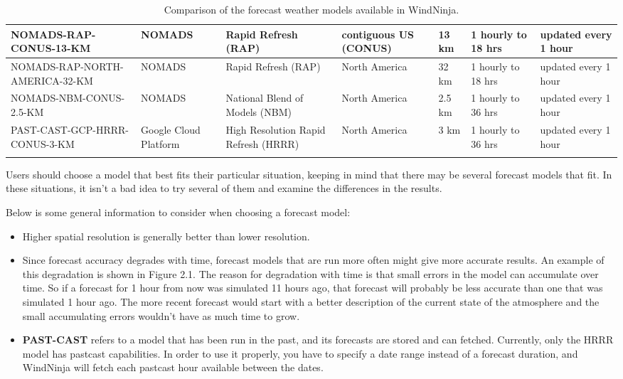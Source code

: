 \documentclass[12pt]{article}
\begin{document}
\begin{landscape}
\begin{longtable}[1]{|p{4.0cm}|p{2.0cm}|p{2.2cm}|p{2.0cm}|p{2.2cm}|p{3.4cm}|p{3.6cm}|}
\hline
NOMADS-RAP-CONUS-13-KM & NOMADS & Rapid Refresh (RAP) & contiguous US (CONUS) & 13 km & 1 hourly to 18 hrs & updated every 1 hour\\
\hline
NOMADS-RAP-NORTH-AMERICA-32-KM & NOMADS & Rapid Refresh (RAP) & North America & 32 km & 1 hourly to 18 hrs & updated every 1 hour\\
\hline
NOMADS-NBM-CONUS-2.5-KM & NOMADS & National Blend of Models (NBM) & North America & 2.5 km & 1 hourly to 36 hrs & updated every 1 hour\\
\hline
\hline
PAST-CAST-GCP-HRRR-CONUS-3-KM & Google Cloud Platform & High Resolution Rapid Refresh (HRRR) & North America & 3 km & 1 hourly to 36 hrs & updated every 1 hour\\
\hline
\caption{Comparison of the forecast weather models available in WindNinja.}
\end{longtable}
\end{landscape}

Users should choose a model that best fits their particular situation, keeping in mind that there may be several forecast models that fit.  In these situations, it isn't a bad idea to try several of them and examine the differences in the results.


Below is some general information to consider when choosing a forecast model:
\begin{itemize}
\item Higher spatial resolution is generally better than lower resolution.
\item Since forecast accuracy degrades with time, forecast models that are run more often might give more accurate results.  An example of this degradation is shown in Figure 2.1.  The reason for degradation with time is that small errors in the model can accumulate over time.  So if a forecast for 1 hour from now was simulated 11 hours ago, that forecast will probably be less accurate than one that was simulated 1 hour ago.  The more recent forecast would start with a better description of the current state of the atmosphere and the small accumulating errors wouldn't have as much time to grow.
\item \textbf{PAST-CAST} refers to a model that has been run in the past, and its forecasts are stored and can fetched. Currently, only the HRRR model has pastcast capabilities. In order to use it properly, you have to specify a date range instead of a forecast duration, and WindNinja will fetch each pastcast hour available between the dates. 
\end{itemize}
\end{document}
